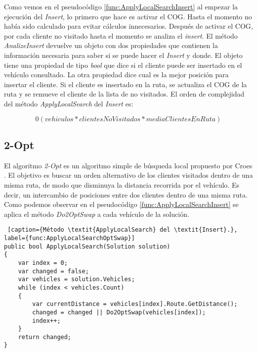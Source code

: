 \bigskip

Como vemos en el pseudocódigo \ref{func:ApplyLocalSearchInsert} al empezar la ejecución del \textit{Insert}, lo primero que hace es activar el COG. Hasta el momento no había sido calculado para evitar cálculos innecesarios. Después de activar el COG, por cada cliente no visitado hasta el momento se analiza el \textit{insert}. El método \textit{AnalizeInsert} devuelve un objeto con dos propiedades que contienen la información necesaria para saber si se puede hacer el \textit{Insert} y donde. El objeto tiene una propiedad de tipo \textit{bool} que dice si el cliente puede ser insertado en el vehículo consultado. La otra propiedad dice cual es la mejor posición para insertar el cliente. Si el cliente es insertado en la ruta, se actualiza el COG de la ruta y se remueve el cliente de la lista de no visitados. El orden de complejidad del método \textit{ApplyLocalSearch} del \textit{Insert} es: 

\begin{equation*}
0(vehiculos * clientesNoVisitados * mediaClientesEnRuta)
\end{equation*}

\subsection{2-Opt}

El algoritmo \textit{2-Opt} es un algoritmo simple de búsqueda local propuesto por Croes \cite{Croes}. El objetivo es buscar un orden alternativo de los clientes visitados dentro de una misma ruta, de modo que disminuya la distancia recorrida por el vehículo. Es decir, un intercambio de posiciones entre dos clientes dentro de una misma ruta. Como podemos observar en el pseudocódigo \ref{func:ApplyLocalSearchInsert} se aplica el método \textit{Do2OptSwap} a cada vehículo de la solución.

\begin{minipage}{\textwidth}
\begin{lstlisting} [caption={Método \textit{ApplyLocalSearch} del \textit{Insert}.}, label={func:ApplyLocalSearchOptSwap}]
public bool ApplyLocalSearch(Solution solution)
{
	var index = 0;
	var changed = false;	
	var vehicles = solution.Vehicles;	
	while (index < vehicles.Count)
	{
		var currentDistance = vehicles[index].Route.GetDistance();
		changed = changed || Do2OptSwap(vehicles[index]);
		index++;
	}
	return changed;
}
\end{lstlisting}
\end{minipage}

